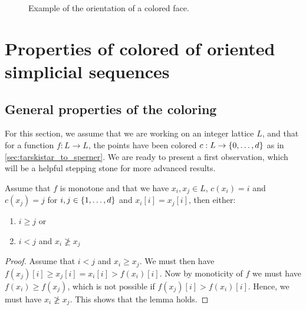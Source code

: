 \begin{figure}[ht]
	\centering
	\caption[Orientation of colored faces]{Example of the orientation of a colored face.}\label{fig:orientation_of_colored_faces}
\end{figure}

\section{Properties of colored of oriented simplicial sequences}

\subsection{General properties of the coloring}

For this section, we assume that we are working on an integer lattice $L$, and that for a function $f: L \rightarrow L$, the points have been colored $c : L \rightarrow \left\{0, \dots, d\right\}$ as in \cref{sec:tarskistar_to_sperner}. We are ready to present a first observation, which will be a helpful stepping stone for more advanced results.

\begin{lemma}\label{lem:monotone_coloring}
	Assume that $f$ is monotone and that we have $x_i, x_j \in L$, $c(x_i) = i$ and $c(x_j) = j$ for $i, j \in \left\{1, \dots, d\right\}$ and $x_i[i] = x_j[i]$, then either:
	\begin{enumerate}
		\item $i \geq j$ or
		\item $i < j$ and $x_i \not\geq x_j$
	\end{enumerate}
\end{lemma}
\begin{proof}
	Assume that $i < j$ and $x_i \geq x_j$. We must then have $f(x_j)[i] \geq x_j[i] = x_i[i] > f(x_i)[i]$. Now by monoticity of $f$ we must have $f(x_i) \geq f(x_j)$, which is not possible if $f(x_j)[i] > f(x_i)[i]$. Hence, we must have $x_i \not\geq x_j$. This shows that the lemma holds.
\end{proof}

